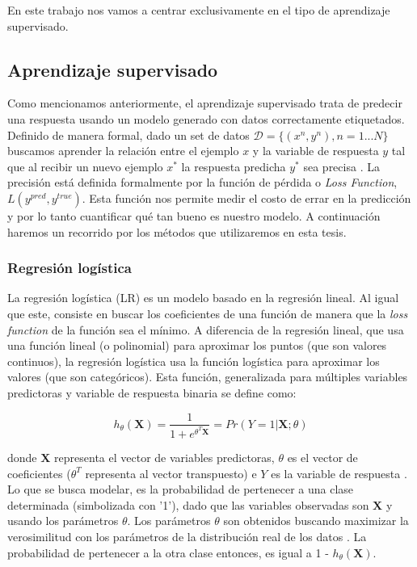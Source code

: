 En este trabajo nos vamos a centrar exclusivamente en el tipo de aprendizaje supervisado.


\subsection{Aprendizaje supervisado}

Como mencionamos anteriormente, el aprendizaje supervisado trata de predecir una respuesta usando un modelo generado con datos correctamente etiquetados. Definido de manera formal, dado un set de datos $ \mathcal{D} = \{(x^n, y^n), n = 1...N\}$  buscamos aprender la relación entre el ejemplo $x$ y la variable de respuesta $y$ tal que al recibir un nuevo ejemplo $x^*$ la respuesta predicha $y^*$ sea precisa \cite{Barber2011}. La precisión está definida formalmente por la función de pérdida o \textit{Loss Function}, $L(y^{pred}, y^{true})$. Esta función nos permite medir el costo de errar en la predicción y por lo tanto cuantificar qué tan bueno es nuestro modelo. A continuación haremos un recorrido por los métodos que utilizaremos en esta tesis.

\subsubsection{Regresión logística}

La regresión logística (LR) es un modelo basado en la regresión lineal. Al igual que este, consiste en buscar los coeficientes de una función de manera que la \textit{loss function} de la función sea el mínimo. A diferencia de la regresión lineal, que usa una función lineal (o polinomial) para aproximar los puntos (que son valores continuos), la regresión logística usa la función logística para aproximar los valores (que son categóricos). Esta función, generalizada para múltiples variables predictoras y variable de respuesta binaria se define como:

\begin{equation*}
h_{\theta}(\boldsymbol{X}) = \frac{1}{1 + e^{\theta^{T}\boldsymbol{X}}} = Pr(Y = 1 | \boldsymbol{X}; \theta)
\end{equation*}

donde $\boldsymbol{X}$ representa el vector de variables predictoras, $\theta$ es el vector de coeficientes ($\theta^{T}$ representa al vector transpuesto) e $Y$ es la variable de respuesta \cite{Barber2011}. Lo que se busca modelar, es la probabilidad de pertenecer a una clase determinada (simbolizada con '1'), dado que las variables observadas son $\boldsymbol{X}$ y usando los parámetros $\theta$. Los parámetros $\theta$ son obtenidos buscando maximizar la verosimilitud con los parámetros de la distribución real de los datos \cite{Hastie2001}. La probabilidad de pertenecer a la otra clase entonces, es igual a 1 - $h_{\theta}(\boldsymbol{X})$.

